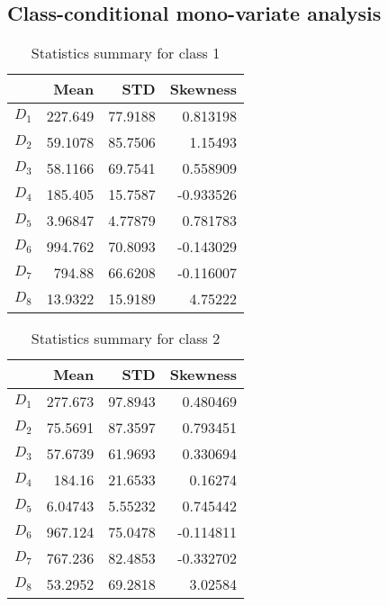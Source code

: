 \documentclass[conference]{IEEEtran}
\begin{document}
\subsection{Class-conditional mono-variate analysis}


\begin{table}[htp]
  \caption{Statistics summary for class 1}
    \centering
    \begin{tabular}{@{} crrr @{}}
      \toprule
       & Mean & STD & Skewness \\ 
      \midrule
      $D_1$ & 227.649  &   77.9188  &   0.813198 \\ 
      $D_2$ & 59.1078  &  85.7506  &   1.15493 \\ 
      $D_3$ & 58.1166  &  69.7541   &  0.558909 \\ 
      $D_4$ & 185.405  &   15.7587  &  -0.933526\\ 
      $D_5$ & 3.96847  &  4.77879  &  0.781783 \\ 
      $D_6$ & 994.762   &  70.8093  &  -0.143029 \\ 
      $D_7$ & 794.88   &   66.6208  &  -0.116007 \\ 
      $D_8$ & 13.9322  &  15.9189  &   4.75222 \\       
      \bottomrule
    \end{tabular}
  \label{Data Statistics Summary}
  \end{table}%

  \begin{table}[htp]
    \caption{Statistics summary for class 2}
      \centering
      \begin{tabular}{@{} crrr @{}}
        \toprule
         & Mean & STD & Skewness \\ 
        \midrule
        $D_1$ & 277.673  &  97.8943  &  0.480469 \\ 
        $D_2$ & 75.5691 &  87.3597  &  0.793451\\ 
        $D_3$ & 57.6739 &  61.9693  &  0.330694 \\ 
        $D_4$ & 184.16   &  21.6533 &   0.16274 \\ 
        $D_5$ & 6.04743  & 5.55232  & 0.745442 \\ 
        $D_6$ & 967.124 &   75.0478  & -0.114811 \\ 
        $D_7$ & 767.236  &  82.4853 &  -0.332702 \\ 
        $D_8$ & 53.2952  & 69.2818  &  3.02584 \\       
        \bottomrule
      \end{tabular}
    \label{Data Statistics Summary}
    \end{table}%
\end{document}
